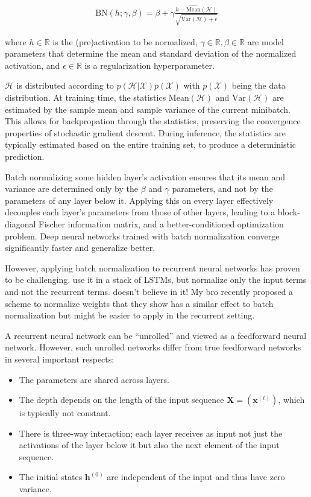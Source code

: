 \documentclass{article} %
\newcommand{\vect}[1]{\mathbf{#1}}
\newcommand{\mat}[1]{\mathbf{#1}}
\newcommand{\reals}{\mathbb{R}}
\begin{document}
\begin{align}
\mathrm{BN}(h; \gamma, \beta) =
  \beta + \gamma
  \frac{h -   \widehat{\mathrm{Mean}}(\mathcal{H})}
       {\sqrt{\widehat{\mathrm{Var }}(\mathcal{H}) + \epsilon}}
\end{align}

where $h \in \reals$ is the (pre)activation to be normalized, $\gamma \in \reals, \beta \in \reals$ are model parameters that determine the mean and standard deviation of the normalized activation, and $\epsilon \in \reals$ is a regularization hyperparameter.

$\mathcal{H}$ is distributed according to $p(\mathcal{H}|\mathcal{X}) p(\mathcal{X})$ with $p(\mathcal{X})$ being the data distribution.
At training time, the statistics $\mathrm{Mean}(\mathcal{H})$ and $\mathrm{Var}(\mathcal{H})$ are estimated by the sample mean and sample variance of the current minibatch.
This allows for backpropation through the statistics, preserving the convergence properties of stochastic gradient descent.
During inference, the statistics are typically estimated based on the entire training set, to produce a deterministic prediction.

Batch normalizing some hidden layer's activation ensures that its mean and variance are determined only by the $\beta$ and $\gamma$ parameters, and not by the parameters of any layer below it.
Applying this on every layer effectively decouples each layer's parameters from those of other layers, leading to a block-diagonal Fischer information matrix, and a better-conditioned optimization problem.
Deep neural networks trained with batch normalization converge significantly faster and generalize better.

However, applying batch normalization to recurrent neural networks has proven to be challenging.
\cite{Baidu} use it in a stack of LSTMs, but normalize only the input terms and not the recurrent terms.
\cite{Cesar} doesn't believe in it!
My bro \cite{Tim Salimans} recently proposed a scheme to normalize weights that they show has a similar effect to batch normalization but might be easier to apply in the recurrent setting.

A recurrent neural network can be ``unrolled'' and viewed as a feedforward neural network.
However, such unrolled networks differ from true feedforward networks in several important respects:
\begin{itemize}
\item The parameters are shared across layers.
\item The depth depends on the length of the input sequence $\mat{X} = (\vect{x}^{(t)})$, which is typically not constant.
\item There is three-way interaction; each layer receives as input not just the activations of the layer below it but also the next element of the input sequence.
\item The initial states $\vect{h}^{(0)}$ are independent of the input and thus have zero variance.
\end{itemize}
\end{document}
